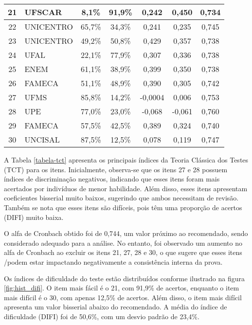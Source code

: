 \begin{table}[H]
{\begin{tabular*}{.8\textwidth}{@{\extracolsep{\fill}}clccccc@{}}
			\midrule
			21 & UFSCAR & 8,1\% & 91,9\% & 0,242 & 0,450 & 0,734 \\ 
			\midrule
			22 & UNICENTRO & 65,7\% & 34,3\% & 0,241 & 0,235 & 0,745 \\ 
			\midrule
			23 & UNICENTRO & 49,2\% & 50,8\% & 0,429 & 0,357 & 0,738 \\ 
			\midrule
			24 & UFAL & 22,1\% & 77,9\% & 0,307 & 0,336 & 0,738 \\ 
			\midrule
			25 & ENEM & 61,1\% & 38,9\% & 0,399 & 0,350 & 0,738 \\ 
			\midrule
			26 & FAMECA & 51,1\% & 48,9\% & 0,390 & 0,305 & 0,742 \\ 
			\midrule
			27 & UFMS & 85,8\% & 14,2\% & -0,0004 & 0,006 & 0,753 \\ 
			\midrule
			28 & UPE & 77,0\% & 23,0\% & -0,068 & -0,061 & 0,760 \\ 
			\midrule
			29 & FAMECA & 57,5\% & 42,5\% & 0,389 & 0,324 & 0,740 \\ 
			\midrule
			30 & UNCISAL & 87,5\% & 12,5\% & 0,078 & 0,119 & 0,747 \\ 
			\bottomrule
		\end{tabular*}
	}{%
	}
\end{table}


A Tabela \ref{tabela-tct} apresenta os principais índices da Teoria Clássica dos Testes (TCT) para os itens. Inicialmente, observa-se que os itens 27 e 28 possuem índices de discriminação negativos, indicando que esses itens foram mais acertados por indivíduos de menor habilidade. Além disso, esses itens apresentam coeficientes bisserial muito baixos, sugerindo que ambos necessitam de revisão. Também se nota que esses itens são difíceis, pois têm uma proporção de acertos (DIFI) muito baixa.


O alfa de Cronbach obtido foi de 0,744, um valor próximo ao recomendado, sendo considerado adequado para a análise. No entanto, foi observado um aumento no alfa de Cronbach ao excluir os itens 21, 27, 28 e 30, o que sugere que esses itens /podem estar impactando negativamente a consistência interna da prova.


Os índices de dificuldade do teste estão distribuídos conforme ilustrado na figura \ref{fig:hist_difi}. O item mais fácil é o 21, com 91,9\% de acertos, enquanto o item mais difícil é o 30, com apenas 12,5\% de acertos. Além disso, o item mais difícil apresenta um valor bisserial abaixo do recomendado. A média do índice de dificuldade (DIFI) foi de 50,6\%, com um desvio padrão de 23,4\%.

